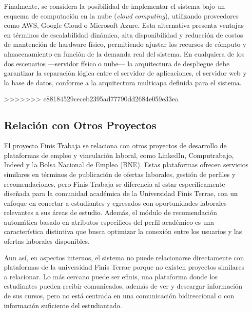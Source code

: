\documentclass[11pt,a4paper]{Plantilla}
\begin{document}
\vspace{5pt}

Finalmente, se considera la posibilidad de implementar el sistema bajo un esquema de computación en la nube (\textit{cloud computing}), utilizando proveedores como AWS, Google Cloud o Microsoft Azure. Esta alternativa presenta ventajas en términos de escalabilidad dinámica, alta disponibilidad y reducción de costos de mantención de hardware físico, permitiendo ajustar los recursos de cómputo y almacenamiento en función de la demanda real del sistema. En cualquiera de los dos escenarios —servidor físico o nube— la arquitectura de despliegue debe garantizar la separación lógica entre el servidor de aplicaciones, el servidor web y la base de datos, conforme a la arquitectura multicapa definida para el sistema.


>>>>>>> c88184529ceceb2395ad77790dd2684e059e33ea


\subsection{Relación con Otros Proyectos}%
El proyecto Finis Trabaja se relaciona con otros proyectos de desarrollo de plataformas de empleo y vinculación laboral, como LinkedIn, Computrabajo, Indeed y la Bolsa Nacional de Empleo (BNE). Estas plataformas ofrecen servicios similares en términos de publicación de ofertas laborales, gestión de perfiles y recomendaciones, pero Finis Trabaja se diferencia al estar específicamente diseñada para la comunidad académica de la Universidad Finis Terrae, con un enfoque en conectar a estudiantes y egresados con oportunidades laborales relevantes a sus áreas de estudio. Además, el módulo de recomendación automática basado en atributos específicos del perfil académico es una característica distintiva que busca optimizar la conexión entre los usuarios y las ofertas laborales disponibles.

\vspace{5pt}

Aun así, en aspectos internos, el sistema no puede relacionarse directamente con plataformas de la universidad Finis Terrae porque no existen proyectos similares a relacionar. Lo más cercano puede ser efinis, una plataforma donde los estudiantes pueden recibir comunicados, además de ver y descargar información de sus cursos, pero no está centrada en una comunicación bidireccional o con información suficiente del estudiantado.

\vspace{5pt}
\end{document}
